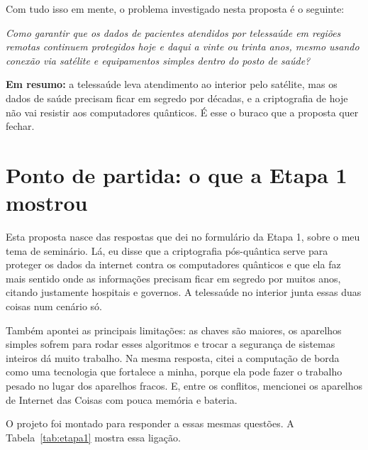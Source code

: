\documentclass[12pt,a4paper]{article}
\newcommand{\resumo}[1]{\begin{emresumo}\textbf{\color{azul}Em resumo:} #1\end{emresumo}}
\begin{document}
Com tudo isso em mente, o problema investigado nesta proposta é o seguinte:

\begin{tcolorbox}[enhanced, colback=white, colframe=azul, boxrule=0.8pt, arc=3pt, left=12pt, right=12pt]
\centering\itshape
Como garantir que os dados de pacientes atendidos por telessaúde em regiões remotas continuem protegidos hoje e daqui a vinte ou trinta anos, mesmo usando conexão via satélite e equipamentos simples dentro do posto de saúde?
\end{tcolorbox}

\resumo{a telessaúde leva atendimento ao interior pelo satélite, mas os dados de saúde precisam ficar em segredo por décadas, e a criptografia de hoje não vai resistir aos computadores quânticos. É esse o buraco que a proposta quer fechar.}

\section{Ponto de partida: o que a Etapa 1 mostrou}

Esta proposta nasce das respostas que dei no formulário da Etapa 1, sobre o meu tema de seminário. Lá, eu disse que a criptografia pós-quântica serve para proteger os dados da internet contra os computadores quânticos e que ela faz mais sentido onde as informações precisam ficar em segredo por muitos anos, citando justamente hospitais e governos. A telessaúde no interior junta essas duas coisas num cenário só.

Também apontei as principais limitações: as chaves são maiores, os aparelhos simples sofrem para rodar esses algoritmos e trocar a segurança de sistemas inteiros dá muito trabalho. Na mesma resposta, citei a computação de borda como uma tecnologia que fortalece a minha, porque ela pode fazer o trabalho pesado no lugar dos aparelhos fracos. E, entre os conflitos, mencionei os aparelhos de Internet das Coisas com pouca memória e bateria.

O projeto foi montado para responder a essas mesmas questões. A Tabela~\ref{tab:etapa1} mostra essa ligação.
\end{document}
